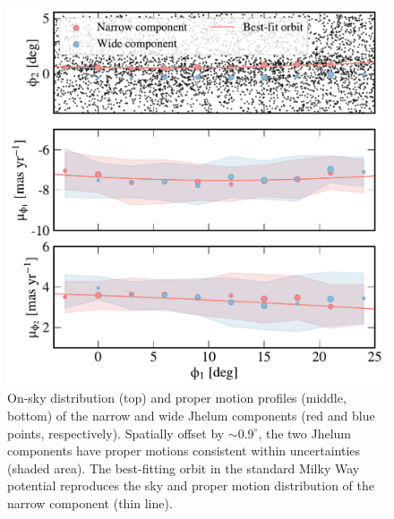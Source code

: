 \documentclass[twocolumn]{aastex62}
\begin{document}
\begin{figure}
\begin{center}
\includegraphics[width=\columnwidth]{components.pdf}
\end{center}
\caption{
On-sky distribution (top) and proper motion profiles (middle, bottom) of the narrow and wide Jhelum components (red and blue points, respectively).
Spatially offset by $\sim0.9^\circ$, the two Jhelum components have proper motions consistent within uncertainties (shaded area).
The best-fitting orbit in the standard Milky Way potential reproduces the sky and proper motion distribution of the narrow component (thin line).
}
\label{fig:components}
\end{figure}
\end{document}
